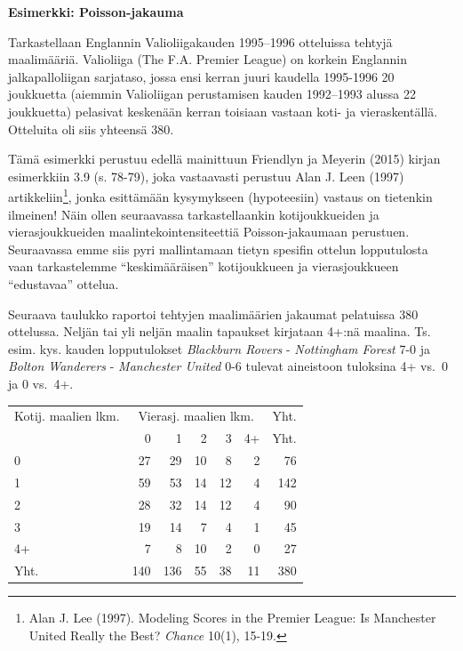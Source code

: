\documentclass[
]{book}
\begin{document}
\begin{eblock}{}
\textbf{Esimerkki: Poisson-jakauma}

Tarkastellaan Englannin Valioliigakauden 1995--1996 otteluissa tehtyjä maalimääriä. Valioliiga (The F.A. Premier League) on korkein Englannin jalkapalloliigan sarjataso, jossa ensi kerran juuri kaudella 1995-1996 20 joukkuetta (aiemmin Valioliigan perustamisen kauden 1992--1993 alussa 22 joukkuetta) pelasivat keskenään kerran toisiaan vastaan koti- ja vieraskentällä. Otteluita oli siis yhteensä 380.

Tämä esimerkki perustuu edellä mainittuun Friendlyn ja Meyerin (2015) kirjan esimerkkiin 3.9 (s. 78-79), joka vastaavasti perustuu Alan J. Leen (1997) artikkeliin\footnote{Alan J. Lee (1997). Modeling Scores in the Premier League: Is Manchester United Really the Best? \emph{Chance} 10(1), 15-19.}, jonka esittämään kysymykseen (hypoteesiin) vastaus on tietenkin ilmeinen! Näin ollen seuraavassa tarkastellaankin kotijoukkueiden ja vierasjoukkueiden maalintekointensiteettiä Poisson-jakaumaan perustuen. Seuraavassa emme siis pyri mallintamaan tietyn spesifin ottelun lopputulosta vaan tarkastelemme ``keskimääräisen'' kotijoukkueen ja vierasjoukkueen ``edustavaa'' ottelua.

Seuraava taulukko raportoi tehtyjen maalimäärien jakaumat pelatuissa 380 ottelussa. Neljän tai yli neljän maalin tapaukset kirjataan 4+:nä maalina. Ts. esim. kys. kauden lopputulokset \emph{Blackburn Rovers} - \emph{Nottingham Forest} 7-0 ja \emph{Bolton Wanderers} - \emph{Manchester United} 0-6 tulevat aineistoon tuloksina 4+ vs.~0 ja 0 vs.~4+.

\end{eblock}

\begin{tabular}{lrrrrrr}
\toprule
\multicolumn{1}{c}{Kotij. maalien lkm.} & \multicolumn{5}{c}{Vierasj. maalien lkm.} & \multicolumn{1}{c}{Yht.} \\
\cmidrule(l{3pt}r{3pt}){1-1} \cmidrule(l{3pt}r{3pt}){2-6} \cmidrule(l{3pt}r{3pt}){7-7}
  & 0 & 1 & 2 & 3 & 4+ & Yht.\\
\midrule
0 & 27 & 29 & 10 & 8 & 2 & 76\\
1 & 59 & 53 & 14 & 12 & 4 & 142\\
2 & 28 & 32 & 14 & 12 & 4 & 90\\
3 & 19 & 14 & 7 & 4 & 1 & 45\\
4+ & 7 & 8 & 10 & 2 & 0 & 27\\
\addlinespace
Yht. & 140 & 136 & 55 & 38 & 11 & 380\\
\bottomrule
\end{tabular}
\end{document}
